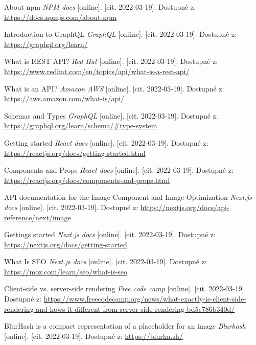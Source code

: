 \begin{thebibliography}{55}
    About npm \textit{NPM docs} [online]. [cit. 2022-03-19]. Dostupné z: \url{https://docs.npmjs.com/about-npm}
    
    Introduction to GraphQL \textit{GraphQL} [online]. [cit. 2022-03-19]. Dostupné z: \url{https://graphql.org/learn/}

    What is REST API? \textit{Red Hat} [online]. [cit. 2022-03-19]. Dostupné z: \url{https://www.redhat.com/en/topics/api/what-is-a-rest-api/}
    
    What is an API? \textit{Amazon AWS} [online]. [cit. 2022-03-19]. Dostupné z: \url{https://aws.amazon.com/what-is/api/}
    
    Schemas and Types \textit{GraphQL} [online]. [cit. 2022-03-19]. Dostupné z: \url{https://graphql.org/learn/schema/#type-system}
    
        
    Getting started \textit{React docs} [online]. [cit. 2022-03-19]. Dostupné z: \url{https://reactjs.org/docs/getting-started.html}
            
    Components and Props \textit{React docs} [online]. [cit. 2022-03-19]. Dostupné z: \url{https://reactjs.org/docs/components-and-props.html}
    
    API documentation for the Image Component and Image Optimization \textit{Next.js docs} [online]. [cit. 2022-03-19]. Dostupné z: \url{https://nextjs.org/docs/api-reference/next/image}

    Gettings started \textit{Next.js docs} [online]. [cit. 2022-03-19]. Dostupné z: \url{https://nextjs.org/docs/getting-started}
    
    What Is SEO \textit{Next.js docs} [online]. [cit. 2022-03-19]. Dostupné z: \url{https://moz.com/learn/seo/what-is-seo}
    
    
    Client-side vs. server-side rendering \textit{Free code camp} [online]. [cit. 2022-03-19]. Dostupné z: \url{https://www.freecodecamp.org/news/what-exactly-is-client-side-rendering-and-hows-it-different-from-server-side-rendering-bd5c786b340d/}
    
    
    BlurHash is a compact representation of a placeholder for an image \textit{Blurhash} [online]. [cit. 2022-03-19]. Dostupné z: \url{https://blurha.sh/}
     

\end{thebibliography}
